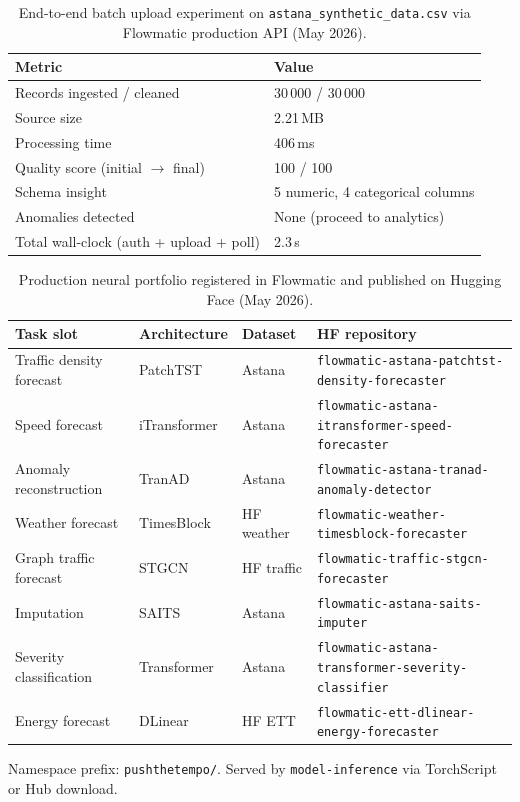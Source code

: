 
\begin{table}[H]
  \centering
  \caption{End-to-end batch upload experiment on \texttt{astana\_synthetic\_data.csv} via Flowmatic production API (May 2026).}
  \label{tab:upload-pipeline-experiment}
  \begin{tabular}{@{}ll@{}}
    \toprule
    \textbf{Metric} & \textbf{Value} \\
    \midrule
    Records ingested / cleaned & 30\,000 / 30\,000 \\
    Source size & 2.21\,MB \\
    Processing time & 406\,ms \\
    Quality score (initial $\rightarrow$ final) & 100 / 100 \\
    Schema insight & 5 numeric, 4 categorical columns \\
    Anomalies detected & None (proceed to analytics) \\
    Total wall-clock (auth + upload + poll) & 2.3\,s \\
    \bottomrule
  \end{tabular}
\end{table}

\begin{table}[H]
  \centering
  \caption{Production neural portfolio registered in Flowmatic and published on Hugging Face (May 2026).}
  \label{tab:production-portfolio}
  \small
  \begin{tabular}{@{}llll@{}}
    \toprule
    \textbf{Task slot} & \textbf{Architecture} & \textbf{Dataset} & \textbf{HF repository} \\
    \midrule
    Traffic density forecast & PatchTST & Astana & \texttt{flowmatic-astana-patchtst-density-forecaster} \\
    Speed forecast & iTransformer & Astana & \texttt{flowmatic-astana-itransformer-speed-forecaster} \\
    Anomaly reconstruction & TranAD & Astana & \texttt{flowmatic-astana-tranad-anomaly-detector} \\
    Weather forecast & TimesBlock & HF weather & \texttt{flowmatic-weather-timesblock-forecaster} \\
    Graph traffic forecast & STGCN & HF traffic & \texttt{flowmatic-traffic-stgcn-forecaster} \\
    Imputation & SAITS & Astana & \texttt{flowmatic-astana-saits-imputer} \\
    Severity classification & Transformer & Astana & \texttt{flowmatic-astana-transformer-severity-classifier} \\
    Energy forecast & DLinear & HF ETT & \texttt{flowmatic-ett-dlinear-energy-forecaster} \\
    \bottomrule
  \end{tabular}
  \vspace{0.4em}

  \raggedright\footnotesize Namespace prefix: \texttt{pushthetempo/}. Served by \texttt{model-inference} via TorchScript or Hub download.
\end{table}

